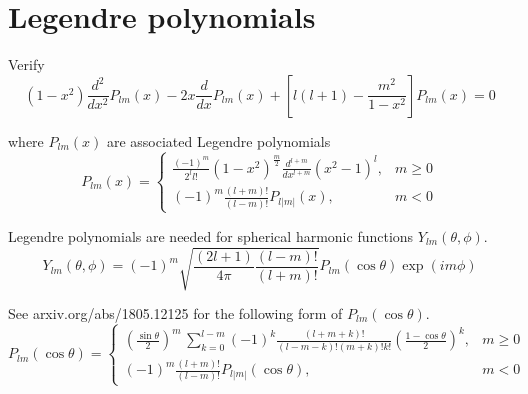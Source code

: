 

\section*{Legendre polynomials}

Verify
\begin{equation*}
(1-x^2)\frac{d^2}{dx^2}P_{lm}(x)-2x\frac{d}{dx}P_{lm}(x)+\left[l(l+1)-\frac{m^2}{1-x^2}\right]P_{lm}(x)=0
\end{equation*}

where $P_{lm}(x)$ are associated Legendre polynomials
\begin{equation*}
P_{lm}(x)=\begin{cases}
\displaystyle
\frac{(-1)^m}{2^ll!}(1-x^2)^\frac{m}{2}\frac{d^{l+m}}{dx^{l+m}}(x^2-1)^l, & m\ge0
\\[3ex]
\displaystyle
(-1)^m\frac{(l+m)!}{(l-m)!}P_{l|m|}(x), & m<0
\end{cases}
\end{equation*}

Legendre polynomials are needed for spherical harmonic functions $Y_{lm}(\theta,\phi)$.
\begin{equation*}
Y_{lm}(\theta,\phi)=(-1)^m\sqrt{\frac{(2l+1)}{4\pi}\frac{(l-m)!}{(l+m)!}}
P_{lm}(\cos\theta)\exp(im\phi)
\end{equation*}

See arxiv.org/abs/1805.12125 for the following form of $P_{lm}(\cos\theta)$.
\begin{equation*}
P_{lm}(\cos\theta)=\begin{cases}
\displaystyle
\left(\frac{\sin\theta}{2}\right)^m\,\sum_{k=0}^{l-m}
(-1)^k\frac{(l+m+k)!}{(l-m-k)!(m+k)!k!}
\left(\frac{1-\cos\theta}{2}\right)^k, & m\ge0
\\[4ex]
\displaystyle
(-1)^m\frac{(l+m)!}{(l-m)!}P_{l|m|}(\cos\theta), & m<0
\end{cases}
\end{equation*}


